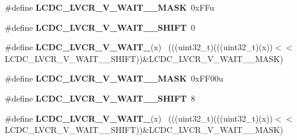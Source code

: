\begin{DoxyCompactItemize}
\item 
\hypertarget{group___l_c_d_c___register___masks_gae517263760ac90740ec7b420fc601a06}{}\#define {\bfseries L\+C\+D\+C\+\_\+\+L\+V\+C\+R\+\_\+\+V\+\_\+\+W\+A\+I\+T\+\_\+\_\+\+M\+A\+S\+K}~0x\+F\+Fu\label{group___l_c_d_c___register___masks_gae517263760ac90740ec7b420fc601a06}

\item 
\hypertarget{group___l_c_d_c___register___masks_ga4ffc51c7ecc2d3f20c6409c9317707e3}{}\#define {\bfseries L\+C\+D\+C\+\_\+\+L\+V\+C\+R\+\_\+\+V\+\_\+\+W\+A\+I\+T\+\_\+\_\+\+S\+H\+I\+F\+T}~0\label{group___l_c_d_c___register___masks_ga4ffc51c7ecc2d3f20c6409c9317707e3}

\item 
\hypertarget{group___l_c_d_c___register___masks_gad32c5b1b216d573675a7793584526324}{}\#define {\bfseries L\+C\+D\+C\+\_\+\+L\+V\+C\+R\+\_\+\+V\+\_\+\+W\+A\+I\+T\+\_}(x)                                    ~(((uint32\+\_\+t)(((uint32\+\_\+t)(x))$<$$<$L\+C\+D\+C\+\_\+\+L\+V\+C\+R\+\_\+\+V\+\_\+\+W\+A\+I\+T\+\_\+\_\+\+S\+H\+I\+F\+T))\&L\+C\+D\+C\+\_\+\+L\+V\+C\+R\+\_\+\+V\+\_\+\+W\+A\+I\+T\+\_\+\_\+\+M\+A\+S\+K)\label{group___l_c_d_c___register___masks_gad32c5b1b216d573675a7793584526324}

\item 
\hypertarget{group___l_c_d_c___register___masks_ga5f2128f0a6abae5857ad15dbb4433cde}{}\#define {\bfseries L\+C\+D\+C\+\_\+\+L\+V\+C\+R\+\_\+\+V\+\_\+\+W\+A\+I\+T\+\_\+\_\+\+M\+A\+S\+K}~0x\+F\+F00u\label{group___l_c_d_c___register___masks_ga5f2128f0a6abae5857ad15dbb4433cde}

\item 
\hypertarget{group___l_c_d_c___register___masks_ga72276c98c12a197adfc9ace52cd02002}{}\#define {\bfseries L\+C\+D\+C\+\_\+\+L\+V\+C\+R\+\_\+\+V\+\_\+\+W\+A\+I\+T\+\_\+\_\+\+S\+H\+I\+F\+T}~8\label{group___l_c_d_c___register___masks_ga72276c98c12a197adfc9ace52cd02002}

\item 
\hypertarget{group___l_c_d_c___register___masks_ga613d4a286eb4a7482f92794c3e654c6b}{}\#define {\bfseries L\+C\+D\+C\+\_\+\+L\+V\+C\+R\+\_\+\+V\+\_\+\+W\+A\+I\+T\+\_}(x)                                    ~(((uint32\+\_\+t)(((uint32\+\_\+t)(x))$<$$<$L\+C\+D\+C\+\_\+\+L\+V\+C\+R\+\_\+\+V\+\_\+\+W\+A\+I\+T\+\_\+\_\+\+S\+H\+I\+F\+T))\&L\+C\+D\+C\+\_\+\+L\+V\+C\+R\+\_\+\+V\+\_\+\+W\+A\+I\+T\+\_\+\_\+\+M\+A\+S\+K)\label{group___l_c_d_c___register___masks_ga613d4a286eb4a7482f92794c3e654c6b}


\end{DoxyCompactItemize}
